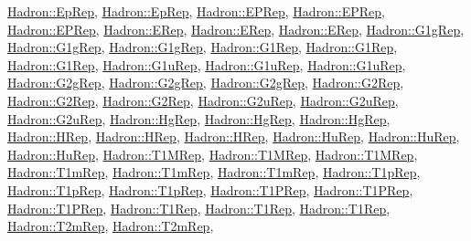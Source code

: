 \mbox{\hyperlink{structHadron_1_1EpRep}{Hadron\+::\+Ep\+Rep}}, \mbox{\hyperlink{structHadron_1_1EpRep}{Hadron\+::\+Ep\+Rep}}, \mbox{\hyperlink{structHadron_1_1EPRep}{Hadron\+::\+E\+P\+Rep}}, \mbox{\hyperlink{structHadron_1_1EPRep}{Hadron\+::\+E\+P\+Rep}}, \mbox{\hyperlink{structHadron_1_1EPRep}{Hadron\+::\+E\+P\+Rep}}, \mbox{\hyperlink{structHadron_1_1ERep}{Hadron\+::\+E\+Rep}}, \mbox{\hyperlink{structHadron_1_1ERep}{Hadron\+::\+E\+Rep}}, \mbox{\hyperlink{structHadron_1_1ERep}{Hadron\+::\+E\+Rep}}, \mbox{\hyperlink{structHadron_1_1G1gRep}{Hadron\+::\+G1g\+Rep}}, \mbox{\hyperlink{structHadron_1_1G1gRep}{Hadron\+::\+G1g\+Rep}}, \mbox{\hyperlink{structHadron_1_1G1gRep}{Hadron\+::\+G1g\+Rep}}, \mbox{\hyperlink{structHadron_1_1G1Rep}{Hadron\+::\+G1\+Rep}}, \mbox{\hyperlink{structHadron_1_1G1Rep}{Hadron\+::\+G1\+Rep}}, \mbox{\hyperlink{structHadron_1_1G1Rep}{Hadron\+::\+G1\+Rep}}, \mbox{\hyperlink{structHadron_1_1G1uRep}{Hadron\+::\+G1u\+Rep}}, \mbox{\hyperlink{structHadron_1_1G1uRep}{Hadron\+::\+G1u\+Rep}}, \mbox{\hyperlink{structHadron_1_1G1uRep}{Hadron\+::\+G1u\+Rep}}, \mbox{\hyperlink{structHadron_1_1G2gRep}{Hadron\+::\+G2g\+Rep}}, \mbox{\hyperlink{structHadron_1_1G2gRep}{Hadron\+::\+G2g\+Rep}}, \mbox{\hyperlink{structHadron_1_1G2gRep}{Hadron\+::\+G2g\+Rep}}, \mbox{\hyperlink{structHadron_1_1G2Rep}{Hadron\+::\+G2\+Rep}}, \mbox{\hyperlink{structHadron_1_1G2Rep}{Hadron\+::\+G2\+Rep}}, \mbox{\hyperlink{structHadron_1_1G2Rep}{Hadron\+::\+G2\+Rep}}, \mbox{\hyperlink{structHadron_1_1G2uRep}{Hadron\+::\+G2u\+Rep}}, \mbox{\hyperlink{structHadron_1_1G2uRep}{Hadron\+::\+G2u\+Rep}}, \mbox{\hyperlink{structHadron_1_1G2uRep}{Hadron\+::\+G2u\+Rep}}, \mbox{\hyperlink{structHadron_1_1HgRep}{Hadron\+::\+Hg\+Rep}}, \mbox{\hyperlink{structHadron_1_1HgRep}{Hadron\+::\+Hg\+Rep}}, \mbox{\hyperlink{structHadron_1_1HgRep}{Hadron\+::\+Hg\+Rep}}, \mbox{\hyperlink{structHadron_1_1HRep}{Hadron\+::\+H\+Rep}}, \mbox{\hyperlink{structHadron_1_1HRep}{Hadron\+::\+H\+Rep}}, \mbox{\hyperlink{structHadron_1_1HRep}{Hadron\+::\+H\+Rep}}, \mbox{\hyperlink{structHadron_1_1HuRep}{Hadron\+::\+Hu\+Rep}}, \mbox{\hyperlink{structHadron_1_1HuRep}{Hadron\+::\+Hu\+Rep}}, \mbox{\hyperlink{structHadron_1_1HuRep}{Hadron\+::\+Hu\+Rep}}, \mbox{\hyperlink{structHadron_1_1T1MRep}{Hadron\+::\+T1\+M\+Rep}}, \mbox{\hyperlink{structHadron_1_1T1MRep}{Hadron\+::\+T1\+M\+Rep}}, \mbox{\hyperlink{structHadron_1_1T1MRep}{Hadron\+::\+T1\+M\+Rep}}, \mbox{\hyperlink{structHadron_1_1T1mRep}{Hadron\+::\+T1m\+Rep}}, \mbox{\hyperlink{structHadron_1_1T1mRep}{Hadron\+::\+T1m\+Rep}}, \mbox{\hyperlink{structHadron_1_1T1mRep}{Hadron\+::\+T1m\+Rep}}, \mbox{\hyperlink{structHadron_1_1T1pRep}{Hadron\+::\+T1p\+Rep}}, \mbox{\hyperlink{structHadron_1_1T1pRep}{Hadron\+::\+T1p\+Rep}}, \mbox{\hyperlink{structHadron_1_1T1pRep}{Hadron\+::\+T1p\+Rep}}, \mbox{\hyperlink{structHadron_1_1T1PRep}{Hadron\+::\+T1\+P\+Rep}}, \mbox{\hyperlink{structHadron_1_1T1PRep}{Hadron\+::\+T1\+P\+Rep}}, \mbox{\hyperlink{structHadron_1_1T1PRep}{Hadron\+::\+T1\+P\+Rep}}, \mbox{\hyperlink{structHadron_1_1T1Rep}{Hadron\+::\+T1\+Rep}}, \mbox{\hyperlink{structHadron_1_1T1Rep}{Hadron\+::\+T1\+Rep}}, \mbox{\hyperlink{structHadron_1_1T1Rep}{Hadron\+::\+T1\+Rep}}, \mbox{\hyperlink{structHadron_1_1T2mRep}{Hadron\+::\+T2m\+Rep}}, \mbox{\hyperlink{structHadron_1_1T2mRep}{Hadron\+::\+T2m\+Rep}}, 